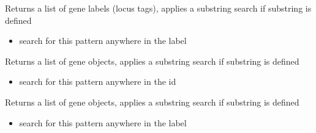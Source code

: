 \documentclass[letterpaper,10pt,english]{sphinxmanual}
\begin{document}
\begin{fulllineitems}
\begin{fulllineitems}
\begin{itemize}
\end{itemize}

\end{fulllineitems}


\begin{fulllineitems}
\label{\detokenize{modules_doc:cbmpy.CBModel.Model.getGeneLabels}}
\pysigstartsignatures
{}
\pysigstopsignatures
\sphinxAtStartPar
Returns a list of gene labels (locus tags), applies a substring search if substring is defined
\begin{itemize}
\item {} 
\sphinxAtStartPar
{} search for this pattern anywhere in the label

\end{itemize}

\end{fulllineitems}


\begin{fulllineitems}
\label{\detokenize{modules_doc:cbmpy.CBModel.Model.getGeneObjects}}
\pysigstartsignatures
{}
\pysigstopsignatures
\sphinxAtStartPar
Returns a list of gene objects, applies a substring search if substring is defined
\begin{itemize}
\item {} 
\sphinxAtStartPar
{} search for this pattern anywhere in the id

\end{itemize}

\end{fulllineitems}


\begin{fulllineitems}
\label{\detokenize{modules_doc:cbmpy.CBModel.Model.getGeneObjectsByLabel}}
\pysigstartsignatures
{}
\pysigstopsignatures
\sphinxAtStartPar
Returns a list of gene objects, applies a substring search if substring is defined
\begin{itemize}
\item {} 
\sphinxAtStartPar
{} search for this pattern anywhere in the label


\end{itemize}
\end{fulllineitems}
\end{fulllineitems}
\end{document}
